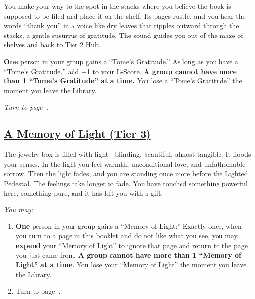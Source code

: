 \documentclass[sheet]{GL2020}
\begin{document}
You make your way to the spot in the stacks where you believe the book is supposed to be filed and place it on the shelf. Its pages rustle, and you hear the words “thank you” in a voice like dry leaves that ripples outward through the stacks, a gentle susurrus of gratitude. The sound guides you out of the maze of shelves and back to Tier 2 Hub.

\textbf{One} person in your group gains a ``Tome’s Gratitude.'' As long as you have a ``Tome’s Gratitude,'' add +1 to your L-Score. \textbf{A group cannot have more than 1 ``Tome’s Gratitude'' at a time.} You lose a ``Tome’s Gratitude'' the moment you leave the Library. 

\vspace{0.5cm}

\emph{Turn to page~\pageref{TierTwoHub}.}

\clearpage

\begin{center}\section*{\underline{A Memory of Light (Tier 3)}}\end{center}
\label{MemoryofLight}

The jewelry box is filled with light - blinding, beautiful, almost tangible. It floods your senses. In the light you feel warmth, unconditional love, and unfathomable sorrow. Then the light fades, and you are standing once more before the Lighted Pedestal. The feelings take longer to fade. You have touched something powerful here, something pure, and it has left you with a gift.

\vspace{0.5cm}

\begingroup
\itshape
You may:
\begin{enumerate}[A]
  \item \textbf{One} person in your group gains a ``Memory of Light:'' Exactly once, when you turn to a page in this booklet and do not like what you see, you may \textbf{expend} your ``Memory of Light'' to ignore that page and return to the page you just came from.\textbf{ A group cannot have more than 1 ``Memory of Light'' at a time.} You lose your ``Memory of Light'' the moment you leave the Library.
	\item Turn to page~\pageref{LightedPedestal}.
\end{enumerate}
\endgroup

\clearpage
\end{document}
